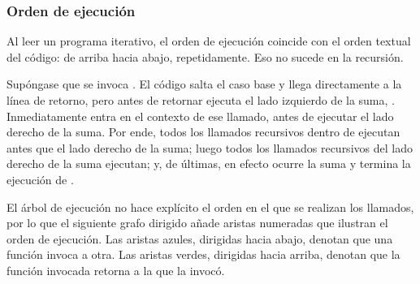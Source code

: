 \subsubsection{Orden de ejecución}

Al leer un programa iterativo, el orden de ejecución coincide con el orden textual del código: de arriba hacia abajo, repetidamente. Eso no sucede en la recursión.

Supóngase que se invoca . El código salta el caso base y llega directamente a la línea de retorno, pero antes de retornar ejecuta el lado izquierdo de la suma, . Inmediatamente entra en el contexto de ese llamado, antes de ejecutar el lado derecho de la suma. Por ende, todos los llamados recursivos dentro de  ejecutan antes que el lado derecho de la suma; luego todos los llamados recursivos del lado derecho de la suma ejecutan; y, de últimas, en efecto ocurre la suma y termina la ejecución de .

El árbol de ejecución no hace explícito el orden en el que se realizan los llamados, por lo que el siguiente grafo dirigido añade aristas numeradas que ilustran el orden de ejecución. Las aristas azules, dirigidas hacia abajo, denotan que una función invoca a otra. Las aristas verdes, dirigidas hacia arriba, denotan que la función invocada retorna a la que la invocó.

